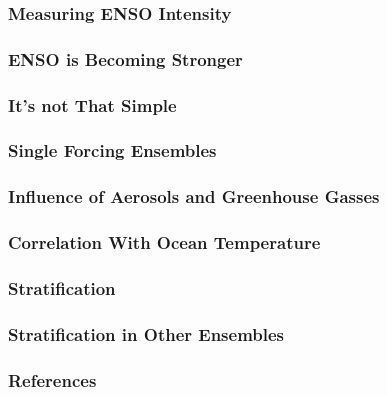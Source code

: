 \documentclass{beamer}
\begin{document}
\begin{frame}
  \frametitle{Measuring ENSO Intensity}

\end{frame}

\begin{frame}
  \frametitle{ENSO is Becoming Stronger}

\end{frame}

\begin{frame}
  \frametitle{It's not That Simple}

\end{frame}

\begin{frame}
  \frametitle{Single Forcing Ensembles}

\end{frame}

\begin{frame}
  \frametitle{Influence of Aerosols and Greenhouse Gasses}

\end{frame}

\begin{frame}
  \frametitle{Correlation With Ocean Temperature}

\end{frame}

\begin{frame}
  \frametitle{Stratification}

\end{frame}

\begin{frame}
  \frametitle{Stratification in Other Ensembles}

\end{frame}

\begin{frame}
  \frametitle{References}
  
  
\end{frame}

\maketitle
\end{document}
